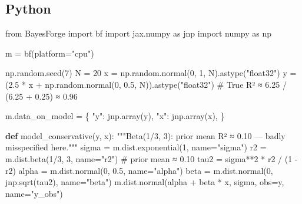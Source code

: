 \documentclass[
  letterpaper,
  DIV=11,
  numbers=noendperiod]{scrartcl}
\newenvironment{Shaded}{\begin{snugshade}}{\end{snugshade}}
\newcommand{\CommentTok}[1]{\textcolor[rgb]{0.37,0.37,0.37}{#1}}
\newcommand{\DecValTok}[1]{\textcolor[rgb]{0.68,0.00,0.00}{#1}}
\newcommand{\FloatTok}[1]{\textcolor[rgb]{0.68,0.00,0.00}{#1}}
\newcommand{\ImportTok}[1]{\textcolor[rgb]{0.00,0.46,0.62}{#1}}
\newcommand{\KeywordTok}[1]{\textcolor[rgb]{0.00,0.23,0.31}{\textbf{#1}}}
\newcommand{\NormalTok}[1]{\textcolor[rgb]{0.00,0.23,0.31}{#1}}
\newcommand{\OperatorTok}[1]{\textcolor[rgb]{0.37,0.37,0.37}{#1}}
\newcommand{\StringTok}[1]{\textcolor[rgb]{0.13,0.47,0.30}{#1}}
\begin{document}
\subsection{Python}

\begin{Shaded}
\begin{Highlighting}[]
\ImportTok{from}\NormalTok{ BayesForge }\ImportTok{import}\NormalTok{ bf}
\ImportTok{import}\NormalTok{ jax.numpy }\ImportTok{as}\NormalTok{ jnp}
\ImportTok{import}\NormalTok{ numpy }\ImportTok{as}\NormalTok{ np}

\NormalTok{m }\OperatorTok{=}\NormalTok{ bf(platform}\OperatorTok{=}\StringTok{"cpu"}\NormalTok{)}

\NormalTok{np.random.seed(}\DecValTok{7}\NormalTok{)}
\NormalTok{N    }\OperatorTok{=} \DecValTok{20}
\NormalTok{x    }\OperatorTok{=}\NormalTok{ np.random.normal(}\DecValTok{0}\NormalTok{, }\DecValTok{1}\NormalTok{, N).astype(}\StringTok{"float32"}\NormalTok{)}
\NormalTok{y    }\OperatorTok{=}\NormalTok{ (}\FloatTok{2.5} \OperatorTok{*}\NormalTok{ x }\OperatorTok{+}\NormalTok{ np.random.normal(}\DecValTok{0}\NormalTok{, }\FloatTok{0.5}\NormalTok{, N)).astype(}\StringTok{"float32"}\NormalTok{)}
\CommentTok{\# True R² ≈ 6.25 / (6.25 + 0.25) ≈ 0.96}

\NormalTok{m.data\_on\_model }\OperatorTok{=}\NormalTok{ \{}
    \StringTok{"y"}\NormalTok{: jnp.array(y),}
    \StringTok{"x"}\NormalTok{: jnp.array(x),}
\NormalTok{\}}

\KeywordTok{def}\NormalTok{ model\_conservative(y, x):}
    \CommentTok{"""Beta(1/3, 3): prior mean R² ≈ 0.10 — badly misspecified here."""}
\NormalTok{    sigma }\OperatorTok{=}\NormalTok{ m.dist.exponential(}\DecValTok{1}\NormalTok{, name}\OperatorTok{=}\StringTok{"sigma"}\NormalTok{)}
\NormalTok{    r2    }\OperatorTok{=}\NormalTok{ m.dist.beta(}\DecValTok{1}\OperatorTok{/}\DecValTok{3}\NormalTok{, }\DecValTok{3}\NormalTok{, name}\OperatorTok{=}\StringTok{"r2"}\NormalTok{)        }\CommentTok{\# prior mean ≈ 0.10}
\NormalTok{    tau2  }\OperatorTok{=}\NormalTok{ sigma}\OperatorTok{**}\DecValTok{2} \OperatorTok{*}\NormalTok{ r2 }\OperatorTok{/}\NormalTok{ (}\DecValTok{1} \OperatorTok{{-}}\NormalTok{ r2)}
\NormalTok{    alpha }\OperatorTok{=}\NormalTok{ m.dist.normal(}\DecValTok{0}\NormalTok{, }\FloatTok{0.5}\NormalTok{, name}\OperatorTok{=}\StringTok{"alpha"}\NormalTok{)}
\NormalTok{    beta  }\OperatorTok{=}\NormalTok{ m.dist.normal(}\DecValTok{0}\NormalTok{, jnp.sqrt(tau2), name}\OperatorTok{=}\StringTok{"beta"}\NormalTok{)}
\NormalTok{    m.dist.normal(alpha }\OperatorTok{+}\NormalTok{ beta }\OperatorTok{*}\NormalTok{ x, sigma, obs}\OperatorTok{=}\NormalTok{y, name}\OperatorTok{=}\StringTok{"y\_obs"}\NormalTok{)}


\end{Highlighting}
\end{Shaded}
\end{document}
